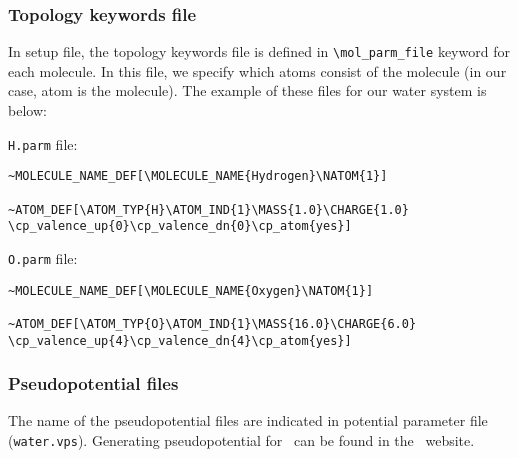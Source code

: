 \subsubsection{Topology keywords file}

In setup file, the topology keywords file is defined in \verb+\mol_parm_file+ keyword for each molecule. In this file, we specify which atoms consist of the molecule (in our case, atom is the molecule). The example of these files for our water system is below:

\verb+H.parm+ file:

\begin{verbatim}
~MOLECULE_NAME_DEF[\MOLECULE_NAME{Hydrogen}\NATOM{1}]

~ATOM_DEF[\ATOM_TYP{H}\ATOM_IND{1}\MASS{1.0}\CHARGE{1.0}
\cp_valence_up{0}\cp_valence_dn{0}\cp_atom{yes}]
\end{verbatim}

\verb+O.parm+ file:

\begin{verbatim}
~MOLECULE_NAME_DEF[\MOLECULE_NAME{Oxygen}\NATOM{1}]

~ATOM_DEF[\ATOM_TYP{O}\ATOM_IND{1}\MASS{16.0}\CHARGE{6.0}
\cp_valence_up{4}\cp_valence_dn{4}\cp_atom{yes}]
\end{verbatim}

\subsubsection{Pseudopotential files}
The name of the pseudopotential files are indicated in potential parameter file (\verb+water.vps+). Generating pseudopotential for \openatom \ can be found in the \openatom \ website.



%